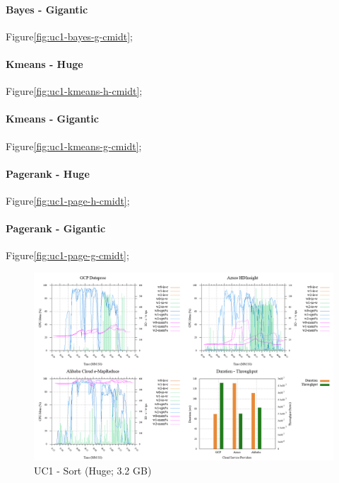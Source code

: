 \documentclass[review]{elsarticle}
\begin{document}
\paragraph{Bayes - Gigantic} Figure\ref{fig:uc1-bayes-g-cmidt};

\paragraph{Kmeans - Huge} Figure\ref{fig:uc1-kmeans-h-cmidt};

\paragraph{Kmeans - Gigantic} Figure\ref{fig:uc1-kmeans-g-cmidt};

\paragraph{Pagerank - Huge} Figure\ref{fig:uc1-page-h-cmidt};

\paragraph{Pagerank - Gigantic} Figure\ref{fig:uc1-page-g-cmidt};

\begin{figure}[b]
	\caption{UC1 - Sort (Huge; 3.2 GB)}
	\label{fig:uc1-srt-h-cmidt}
	\includegraphics[width=\textwidth]{uc1-srt-h-cmidt}
	\centering
\end{figure}
\end{document}
